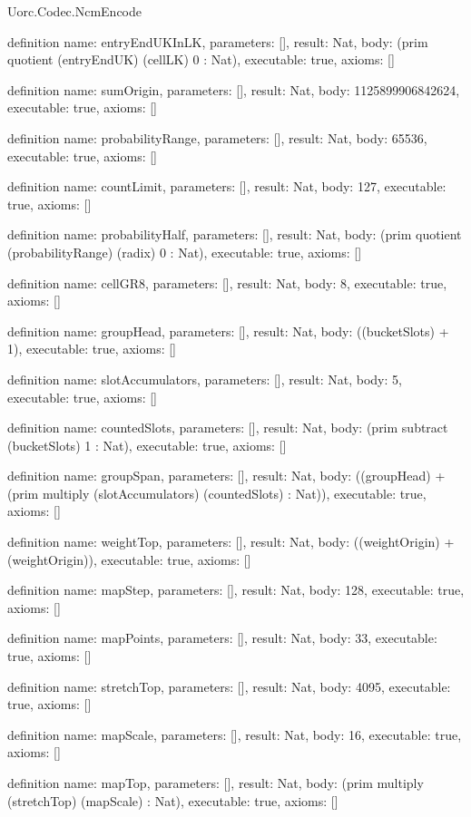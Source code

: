 \begin{lexlean}{Uorc.Codec.NcmEncode}
\begin{semanticmodule}
definition{
  name: entryEndUKInLK,
  parameters: [],
  result: Nat,
  body: (prim quotient (entryEndUK) (cellLK) 0 : Nat),
  executable: true,
  axioms: []
}

definition{
  name: sumOrigin,
  parameters: [],
  result: Nat,
  body: 1125899906842624,
  executable: true,
  axioms: []
}

definition{
  name: probabilityRange,
  parameters: [],
  result: Nat,
  body: 65536,
  executable: true,
  axioms: []
}

definition{
  name: countLimit,
  parameters: [],
  result: Nat,
  body: 127,
  executable: true,
  axioms: []
}

definition{
  name: probabilityHalf,
  parameters: [],
  result: Nat,
  body: (prim quotient (probabilityRange) (radix) 0 : Nat),
  executable: true,
  axioms: []
}

definition{
  name: cellGR8,
  parameters: [],
  result: Nat,
  body: 8,
  executable: true,
  axioms: []
}

definition{
  name: groupHead,
  parameters: [],
  result: Nat,
  body: ((bucketSlots) + 1),
  executable: true,
  axioms: []
}

definition{
  name: slotAccumulators,
  parameters: [],
  result: Nat,
  body: 5,
  executable: true,
  axioms: []
}

definition{
  name: countedSlots,
  parameters: [],
  result: Nat,
  body: (prim subtract (bucketSlots) 1 : Nat),
  executable: true,
  axioms: []
}

definition{
  name: groupSpan,
  parameters: [],
  result: Nat,
  body: ((groupHead) + (prim multiply (slotAccumulators) (countedSlots) : Nat)),
  executable: true,
  axioms: []
}

definition{
  name: weightTop,
  parameters: [],
  result: Nat,
  body: ((weightOrigin) + (weightOrigin)),
  executable: true,
  axioms: []
}

definition{
  name: mapStep,
  parameters: [],
  result: Nat,
  body: 128,
  executable: true,
  axioms: []
}

definition{
  name: mapPoints,
  parameters: [],
  result: Nat,
  body: 33,
  executable: true,
  axioms: []
}

definition{
  name: stretchTop,
  parameters: [],
  result: Nat,
  body: 4095,
  executable: true,
  axioms: []
}

definition{
  name: mapScale,
  parameters: [],
  result: Nat,
  body: 16,
  executable: true,
  axioms: []
}

definition{
  name: mapTop,
  parameters: [],
  result: Nat,
  body: (prim multiply (stretchTop) (mapScale) : Nat),
  executable: true,
  axioms: []
}


\end{semanticmodule}
\end{lexlean}
